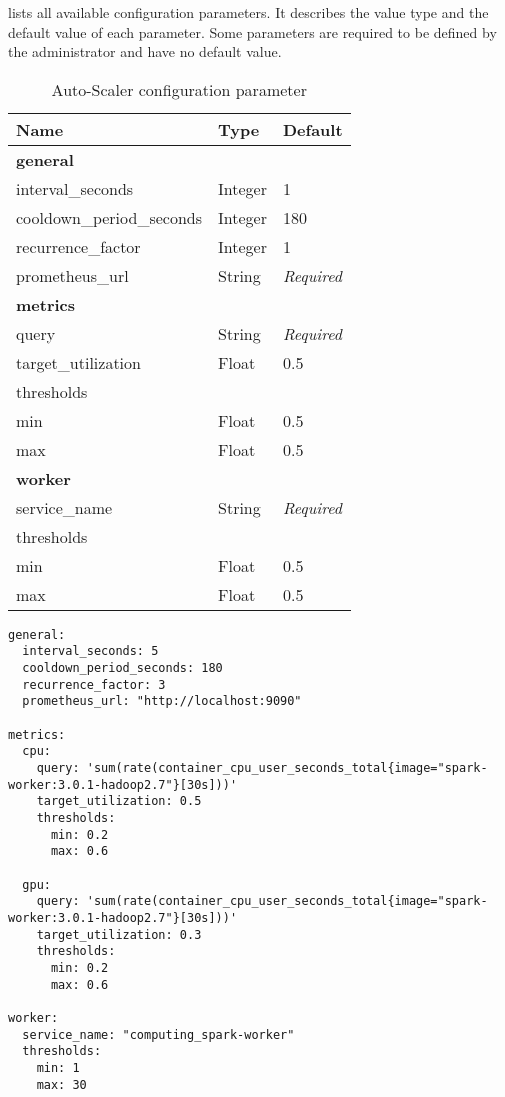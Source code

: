  lists all available configuration parameters. It describes the value type and the default value of each parameter. Some parameters are required to be defined by the administrator and have no default value.
\begin{table}[]
\centering
\begin{tabular}{@{}lll@{}}
\toprule
Name                      & Type    & Default           \\ \midrule
\multicolumn{3}{l}{\textbf{general}}                    \\ \midrule
interval\_seconds         & Integer & 1                 \\
cooldown\_period\_seconds & Integer & 180               \\
recurrence\_factor        & Integer & 1                 \\
prometheus\_url           & String  & \textit{Required} \\
\multicolumn{3}{l}{\textbf{metrics}}                    \\ \midrule
query                     & String  & \textit{Required} \\
target\_utilization       & Float   & 0.5               \\
\multicolumn{3}{l}{thresholds}                          \\
min                       & Float   & 0.5               \\
max                       & Float   & 0.5               \\
\multicolumn{3}{l}{\textbf{worker}}                     \\ \midrule
service\_name             & String  & \textit{Required} \\
\multicolumn{3}{l}{thresholds}                          \\
min                       & Float   & 0.5               \\
max                       & Float   & 0.5               \\ \bottomrule
\end{tabular}
\caption{Auto-Scaler configuration parameter}
\label{table:06_auto-scaler_config_parameter}
\end{table}

\begin{lstlisting}[label=lst:06_auto-scaler_config_example, caption=Auto-Scaler configuration YAML file]
general:
  interval_seconds: 5
  cooldown_period_seconds: 180
  recurrence_factor: 3
  prometheus_url: "http://localhost:9090"
 
metrics:
  cpu:
    query: 'sum(rate(container_cpu_user_seconds_total{image="spark-worker:3.0.1-hadoop2.7"}[30s]))'
    target_utilization: 0.5
    thresholds:
      min: 0.2
      max: 0.6
  
  gpu:
    query: 'sum(rate(container_cpu_user_seconds_total{image="spark-worker:3.0.1-hadoop2.7"}[30s]))'
    target_utilization: 0.3
    thresholds:
      min: 0.2
      max: 0.6
 
worker:
  service_name: "computing_spark-worker"
  thresholds:
    min: 1
    max: 30
\end{lstlisting}


